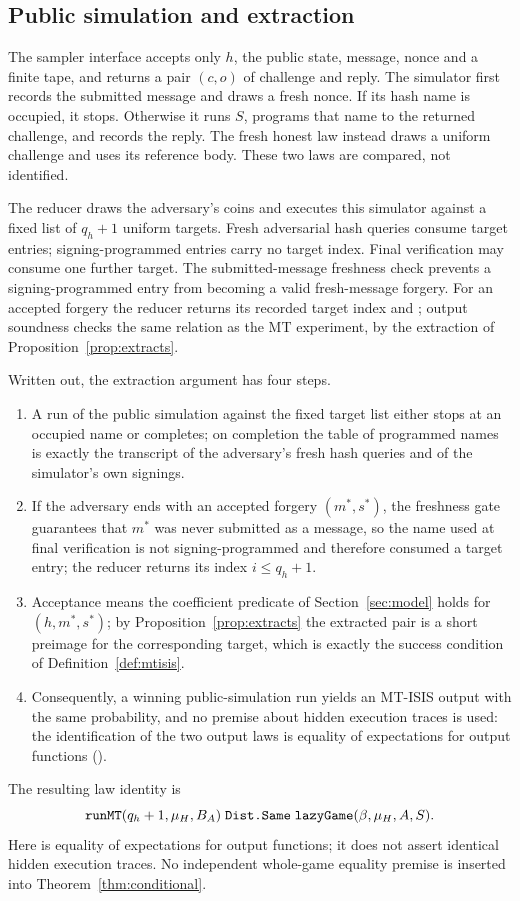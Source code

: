 \subsection{Public simulation and extraction}\label{sec:extraction}
The sampler interface accepts only $h$, the public state, message,
nonce and a finite tape, and returns a pair $(c,o)$ of challenge and
reply. The simulator first records the submitted message and draws a
fresh nonce. If its hash name is occupied, it stops. Otherwise it runs
$S$, programs that name to the returned challenge, and records the
reply. The fresh honest law instead draws a uniform challenge and
uses its reference body. These two laws are compared, not identified.

The reducer draws the adversary's coins and executes this simulator
against a fixed list of $q_h+1$ uniform targets. Fresh adversarial hash
queries consume target entries; signing-programmed entries carry no
target index. Final verification may consume one further target.
The submitted-message freshness check prevents a signing-programmed
entry from becoming a valid fresh-message forgery. For an accepted
forgery the reducer returns its recorded target index and
; output soundness checks the same relation as
the MT experiment, by the extraction of
Proposition~\ref{prop:extracts}.

Written out, the extraction argument has four steps.
\begin{enumerate}
\item A run of the public simulation against the fixed target list
 either stops at an occupied name or completes; on completion the
 table of programmed names is exactly the transcript of the adversary's
 fresh hash queries and of the simulator's own signings.
\item If the adversary ends with an accepted forgery $(m^\ast,s^\ast)$,
 the freshness gate guarantees that $m^\ast$ was never submitted as a
 message, so the name used at final verification is not
 signing-programmed and therefore consumed a target entry; the reducer
 returns its index $i\leq q_h+1$.
\item Acceptance means the coefficient predicate of
 Section~\ref{sec:model} holds for $(h,m^\ast,s^\ast)$; by
 Proposition~\ref{prop:extracts} the extracted pair is a short
 preimage for the corresponding target, which is exactly the success
 condition of Definition~\ref{def:mtisis}.
\item Consequently, a winning public-simulation run yields an MT-ISIS
 output with the same probability, and no premise about hidden
 execution traces is used: the identification of the two output laws
 is equality of expectations for output functions
 ().
\end{enumerate}
The resulting law identity is
\[
 \code{runMT}(q_h+1,\mu_H,B_A)
 \mathrel{\code{Dist.Same}}
 \code{lazyGame}(\beta,\mu_H,A,S).
\]
Here  is equality of expectations for output functions;
it does not assert identical hidden execution traces. No independent
whole-game equality premise is inserted into
Theorem~\ref{thm:conditional}.

